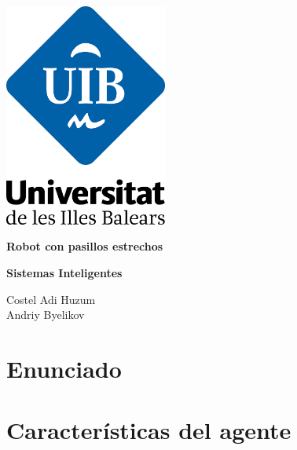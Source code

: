 \documentclass[12pt]{report}
\begin{document}
\begin{titlepage}
    \begin{center}
 
 
 
        \includegraphics[width=0.4\textwidth]{logo}
        
        \vspace*{1cm}
 
        \vspace{0.5cm}
 
        \vspace{1.5cm}
        
        \Huge
        \textbf{Robot con pasillos estrechos}
        
        \vfill
 
        \Large
        
        \textbf{Sistemas Inteligentes}\\
        
        \vspace{1.5cm}
        
        Costel Adi Huzum\\
        Andriy Byelikov\\

    \end{center}
\end{titlepage}

\tableofcontents

\chapter{Enunciado}


\chapter{Características del agente}

\end{document}

